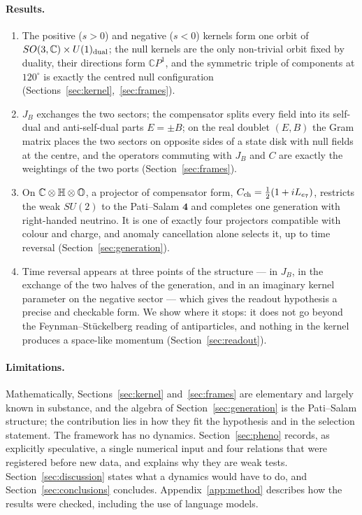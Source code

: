 \paragraph{Results.}
\begin{enumerate}
\item The positive (\(s>0\)) and negative (\(s<0\)) kernels form one orbit of \(SO(3,\mathbb C)\times U(1)_{\rm dual}\); the null kernels are the only
non-trivial orbit fixed by duality, their directions form \(\mathbb CP^1\), and the symmetric triple of components at \(120^\circ\) is exactly the
centred null configuration (Sections~\ref{sec:kernel},~\ref{sec:frames}).
\item \(J_B\) exchanges the two sectors; the compensator splits every field into its self-dual and anti-self-dual parts \(E=\pm B\); on the real
doublet \((E,B)\) the Gram matrix places the two sectors on opposite sides of a state disk with null fields at the centre, and the operators
commuting with \(J_B\) and \(C\) are exactly the weightings of the two ports (Section~\ref{sec:frames}).
\item On \(\mathbb C\otimes\mathbb H\otimes\mathbb O\), a projector of compensator form, \(C_{\rm ch}=\tfrac12(1+iL_{e_7})\), restricts the weak \(SU(2)\) to the Pati--Salam
\(\mathbf4\) and completes one generation with right-handed neutrino.  It is one of exactly four projectors compatible with colour and charge, and
anomaly cancellation alone selects it, up to time reversal (Section~\ref{sec:generation}).
\item Time reversal appears at three points of the structure --- in \(J_B\), in the exchange of the two halves of the generation, and in an
imaginary kernel parameter on the negative sector --- which gives the readout hypothesis a precise and checkable form.  We show where it stops:
it does not go beyond the Feynman--St\"uckelberg reading of antiparticles, and nothing in the kernel produces a space-like momentum
(Section~\ref{sec:readout}).
\end{enumerate}

\paragraph{Limitations.}  Mathematically, Sections~\ref{sec:kernel} and~\ref{sec:frames} are elementary and largely known in substance, and the
algebra of Section~\ref{sec:generation} is the Pati--Salam structure; the contribution lies in how they fit the hypothesis and in the selection
statement.  The framework has no dynamics.  Section~\ref{sec:pheno} records, as explicitly speculative, a single numerical input and four
relations that were registered before new data, and explains why they are weak tests.  Section~\ref{sec:discussion} states what a dynamics
would have to do, and Section~\ref{sec:conclusions} concludes.  Appendix~\ref{app:method} describes how the results were checked, including the
use of language models.
